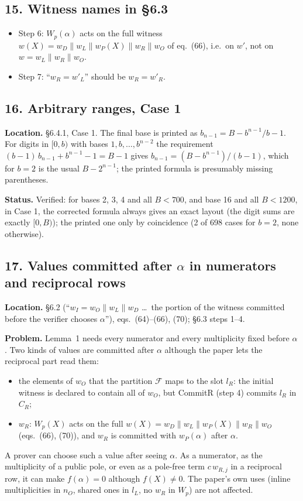 \documentclass[11pt,a4paper]{article}
\newcommand{\status}[1]{\par\noindent\textbf{Status.} #1}
\newcommand{\loc}[1]{\par\noindent\textbf{Location.} #1}
\begin{document}
\subsection*{15. Witness names in \S6.3}
\begin{itemize}
  \item Step 6: $W_p(\alpha)$ acts on the full witness $w(X) = w_D \| w_L \| w_P(X) \| w_R \| w_O$
    of eq.~(66), i.e.\ on $w'$, not on $w = w_L \| w_R \| w_O$.
  \item Step 7: ``$w_R = w'_L$'' should be $w_R = w'_R$.
\end{itemize}

\subsection*{16. Arbitrary ranges, Case 1}
\loc{\S6.4.1, Case 1.} The final base is printed as $b_{n-1} = B - b^{n-1}/b - 1$. For digits in
$[0, b)$ with bases $1, b, \dots, b^{n-2}$ the requirement
$(b-1)\, b_{n-1} + b^{n-1} - 1 = B - 1$ gives $b_{n-1} = (B - b^{n-1})/(b - 1)$, which for $b = 2$
is the usual $B - 2^{n-1}$; the printed formula is presumably missing parentheses.
\status{Verified: for bases 2, 3, 4 and all $B < 700$, and base 16 and all $B < 1200$, in Case 1,
the corrected formula always gives an exact layout (the digit sums are exactly $[0, B)$); the printed one only
by coincidence (2 of 698 cases for $b = 2$, none otherwise).}

\subsection*{17. Values committed after $\alpha$ in numerators and reciprocal rows}
\loc{\S6.2 (``$w_I = w_O \| w_L \| w_D$ \dots\ the portion of the witness committed before the
verifier chooses $\alpha$''), eqs.~(64)--(66), (70); \S6.3 steps 1--4.}

\noindent\textbf{Problem.} Lemma~1 needs every numerator and every multiplicity fixed before
$\alpha$. Two kinds of values are committed after $\alpha$ although the paper lets the reciprocal
part read them:
\begin{itemize}
  \item the elements of $w_O$ that the partition $\mathcal F$ maps to the slot $l_R$: the initial
    witness is declared to contain all of $w_O$, but CommitR (step 4) commits $l_R$ in $C_R$;
  \item $w_R$: $W_p(X)$ acts on the full $w(X) = w_D \| w_L \| w_P(X) \| w_R \| w_O$ (eqs.~(66),
    (70)), and $w_R$ is committed with $w_P(\alpha)$ after $\alpha$.
\end{itemize}
A prover can choose such a value after seeing $\alpha$. As a numerator, as the multiplicity of a
public pole, or even as a pole-free term $c\, w_{R,j}$ in a reciprocal row, it can make
$f(\alpha) = 0$ although $f(X) \ne 0$. The paper's own uses (inline multiplicities in $n_O$,
shared ones in $l_L$, no $w_R$ in $W_p$) are not affected.
\end{document}
